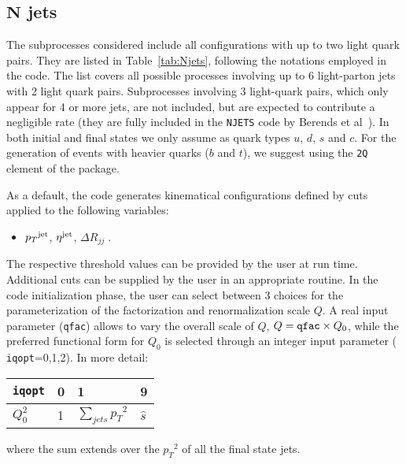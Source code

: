 \documentclass[paper]{JHEP3}
\def    \pt             {\mbox{$p_T$}}
\begin{document}
\subsection{$\mathbf{ N}$ jets}
\label{sec:Njets}
The subprocesses considered include all configurations with up to two
light quark pairs. They are listed in Table~\ref{tab:Njets}, following
the notations employed in the code. The list covers all possible
processes involving up to 6 light-parton jets with 2 light quark
pairs.  Subprocesses involving 3 light-quark pairs, which only appear
for 4 or more jets, are not included, but are expected to contribute a
negligible rate (they are fully included in the {\tt \small NJETS}
code by Berends et al~\cite{Berends:1989ie}).  In both initial and
final states we only assume as quark types $u$, $d$, $s$ and $c$. For
the generation of events with heavier quarks ($b$ and $t$), we suggest
using the {\tt 2Q} element of the package.

As a default, the code generates kinematical configurations defined by
cuts applied to the following variables:
\begin{itemize}
\item $\pt^{\rm jet}$, $\eta^{\rm jet}$, $\Delta R_{jj} \; .$
\end{itemize}
The respective threshold values can be provided by the user at run
time. Additional cuts can be supplied by the user in an appropriate
routine. 
In the code initialization phase, the user can select 
between 3 choices for the parameterization of the 
factorization and renormalization scale $Q$. A real input
parameter ({\tt qfac}) allows to vary the overall scale of $Q$,
$Q={\tt qfac}\times Q_0$, while the preferred functional form for
$Q_0$ is selected through an integer input parameter ({\tt
iqopt}=0,1,2).  In more detail:
{\renewcommand{\arraystretch}{1.2}
\begin{center}
\begin{tabular}{l||l|l|l}
{\tt iqopt} & 0 & 1 & 9 \\  \hline
$Q_0^2$ & 1 & $\sum_{jets}\pt^2$ & $\hat{s}$ \\
\end{tabular}
\end{center}}
where the sum extends over the $\pt^2$ of all the final state jets.
\end{document}
